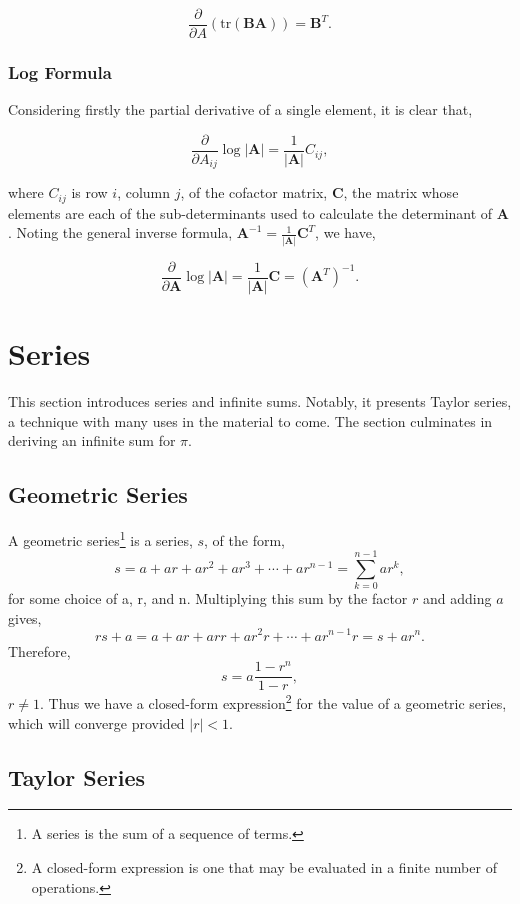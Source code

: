 \documentclass[11pt]{amsart}
\begin{document}
$$\frac{\partial}{\partial A} (\text{tr}(\mathbf{BA})) = \mathbf{B}^T.$$

\subsubsection{Log Formula}

Considering firstly the partial derivative of a single element, it is clear that,

$$\frac{\partial}{\partial A_{ij}}\log|\mathbf{A}| = \frac{1}{|\mathbf{A}|}C_{ij},$$

where $C_{ij}$ is row $i$, column $j$, of the cofactor matrix, $\mathbf{C}$, the matrix whose elements are each of the sub-determinants used to calculate the determinant of $\mathbf{A}$. Noting the general inverse formula, $\mathbf{A}^{-1} = \frac{1}{|\mathbf{A}|}\mathbf{C}^T$, we have,

$$\frac{\partial}{\partial \mathbf{A}}\log|\mathbf{A}| = \frac{1}{|\mathbf{A}|}\mathbf{C} = (\mathbf{A}^T)^{-1}.$$

\section{Series}

This section introduces series and infinite sums. Notably, it presents Taylor series, a technique with many uses in the material to come. The section culminates in deriving an infinite sum for $\pi$.

\subsection{Geometric Series}

A geometric series\footnote{A series is the sum of a sequence of terms.} is a series, $s$, of the form, $$s = a + ar + ar^2 + ar^3 + \cdots + ar^{n-1} = \sum_{k=0}^{n-1}ar^k,$$ for some choice of a, r, and n. Multiplying this sum by the factor $r$ and adding $a$ gives, $$rs + a = a + ar + arr + ar^2r + \cdots + ar^{n-1}r = s + ar^n.$$ Therefore, $$s = a\frac{1 - r^n}{1 - r},$$ $r \neq 1$. Thus we have a closed-form expression\footnote{A closed-form expression is one that may be evaluated in a finite number of operations.} for the value of a geometric series, which will converge provided $|r| < 1$.

\subsection{Taylor Series}
\end{document}
